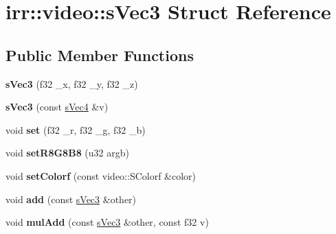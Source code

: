 \hypertarget{structirr_1_1video_1_1s_vec3}{\section{irr\-:\-:video\-:\-:s\-Vec3 Struct Reference}
\label{structirr_1_1video_1_1s_vec3}
}
\subsection*{Public Member Functions}
\begin{DoxyCompactItemize}
\item 
\hypertarget{structirr_1_1video_1_1s_vec3_ac07d7413a0a03da3963ba374e718b2ce}{{\bfseries s\-Vec3} (f32 \-\_\-x, f32 \-\_\-y, f32 \-\_\-z)}\label{structirr_1_1video_1_1s_vec3_ac07d7413a0a03da3963ba374e718b2ce}

\item 
\hypertarget{structirr_1_1video_1_1s_vec3_a9728f34ee8b677f6a8c52c4a6d1ddccc}{{\bfseries s\-Vec3} (const \hyperlink{structirr_1_1video_1_1s_vec4}{s\-Vec4} \&v)}\label{structirr_1_1video_1_1s_vec3_a9728f34ee8b677f6a8c52c4a6d1ddccc}

\item 
\hypertarget{structirr_1_1video_1_1s_vec3_a95e3ae0e2528d494cfeba59e896baae0}{void {\bfseries set} (f32 \-\_\-r, f32 \-\_\-g, f32 \-\_\-b)}\label{structirr_1_1video_1_1s_vec3_a95e3ae0e2528d494cfeba59e896baae0}

\item 
\hypertarget{structirr_1_1video_1_1s_vec3_aa1fe680977af7a9a47f7c83dc9fd6942}{void {\bfseries set\-R8\-G8\-B8} (u32 argb)}\label{structirr_1_1video_1_1s_vec3_aa1fe680977af7a9a47f7c83dc9fd6942}

\item 
\hypertarget{structirr_1_1video_1_1s_vec3_a0e82fb2cdc73503fad92ac842e45f27c}{void {\bfseries set\-Colorf} (const video\-::\-S\-Colorf \&color)}\label{structirr_1_1video_1_1s_vec3_a0e82fb2cdc73503fad92ac842e45f27c}

\item 
\hypertarget{structirr_1_1video_1_1s_vec3_a1e3a256c8f2d6e65630d58fa815239e9}{void {\bfseries add} (const \hyperlink{structirr_1_1video_1_1s_vec3}{s\-Vec3} \&other)}\label{structirr_1_1video_1_1s_vec3_a1e3a256c8f2d6e65630d58fa815239e9}

\item 
\hypertarget{structirr_1_1video_1_1s_vec3_af8ea80abcd3584fb11cc494388062f4c}{void {\bfseries mul\-Add} (const \hyperlink{structirr_1_1video_1_1s_vec3}{s\-Vec3} \&other, const f32 v)}\label{structirr_1_1video_1_1s_vec3_af8ea80abcd3584fb11cc494388062f4c}


\end{DoxyCompactItemize}
